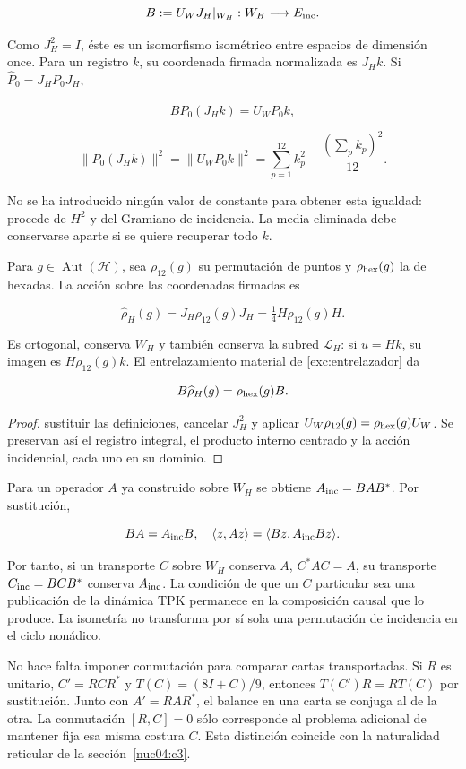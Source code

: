 \[
B:=U_WJ_H|_{W_H}:W_H\longrightarrow E_{\rm inc}.
\]

Como \(J_H^2=I\), éste es un isomorfismo isométrico entre espacios de dimensión once. Para un registro \(k\), su coordenada firmada normalizada es \(J_Hk\). Si \(\widehat P_0=J_HP_0J_H\),

\[
B\widehat P_0(J_Hk)=U_WP_0k,
\]

\[
\|\widehat P_0(J_Hk)\|^2
=\|U_WP_0k\|^2
=\sum_{p=1}^{12}k_p^2-\frac{(\sum_pk_p)^2}{12}.
\]

No se ha introducido ningún valor de constante para obtener esta igualdad: procede de \(H^2\) y del Gramiano de incidencia. La media eliminada debe conservarse aparte si se quiere recuperar todo \(k\).

Para \(g\in\operatorname{Aut}(\mathcal H)\), sea \(\rho_{12}(g)\) su permutación de puntos y \(\rho_{\rm hex}(g)\) la de hexadas. La acción sobre las coordenadas firmadas es

\[
\widehat\rho_H(g)=J_H\rho_{12}(g)J_H
=\tfrac14H\rho_{12}(g)H.
\]

Es ortogonal, conserva \(W_H\) y también conserva la subred \(\mathcal L_H\): si \(u=Hk\), su imagen es \(H\rho_{12}(g)k\). El entrelazamiento material de \cref{exc:entrelazador} da

\[
B\widehat\rho_H(g)=\rho_{\rm hex}(g)B.
\]

\begin{proof}
sustituir las definiciones, cancelar \(J_H^2\) y aplicar \(U_W\rho_{12}(g)=\rho_{\rm hex}(g)U_W\). Se preservan así el registro integral, el producto interno centrado y la acción incidencial, cada uno en su dominio.
\end{proof}

Para un operador \(A\) ya construido sobre \(W_H\) se obtiene \(A_{\rm inc}=BAB^*\). Por sustitución,

\[
BA=A_{\rm inc}B,\quad
\langle z,Az\rangle=\langle Bz,A_{\rm inc}Bz\rangle.
\]

Por tanto, si un transporte \(C\) sobre \(W_H\) conserva \(A\), \(C^*AC=A\), su transporte \(C_{\rm inc}=BCB^*\) conserva \(A_{\rm inc}\). La condición de que un \(C\) particular sea una publicación de la dinámica TPK permanece en la composición causal que lo produce. La isometría no transforma por sí sola una permutación de incidencia en el ciclo nonádico.

No hace falta imponer conmutación para comparar cartas transportadas. Si \(R\) es unitario, \(C'=RCR^*\) y \(T(C)=(8I+C)/9\), entonces \(T(C')R=RT(C)\) por sustitución. Junto con \(A'=RAR^*\), el balance en una carta se conjuga al de la otra. La conmutación \([R,C]=0\) sólo corresponde al problema adicional de mantener fija esa misma costura \(C\). Esta distinción coincide con la naturalidad reticular de la sección~\ref{nuc04:c3}.

